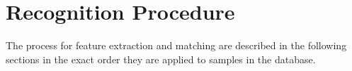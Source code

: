 \chapter{Recognition Procedure\label{ch:methodology}}

The process for feature extraction and matching are described in the following sections in the exact order they are applied to samples in the database.





